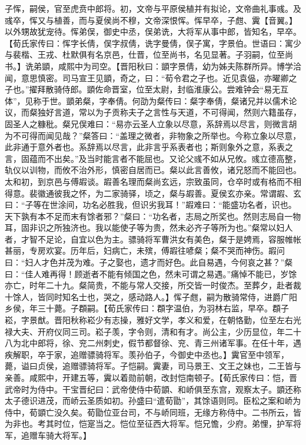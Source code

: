 \documentclass[12pt,UTF8]{ctexbook}
\begin{document}
子恽，嗣侯，官至虎贲中郎将。初，文帝与平原侯植并有拟论，文帝曲礼事彧。及彧卒，恽又与植善，而与夏侯尚不穆，文帝深恨恽。恽早卒，子甝、霬【音翼。】以外甥故犹宠待。恽弟俣，御史中丞，俣弟诜，大将军从事中郎，皆知名，早卒。【荀氏家传曰：恽字长倩，俣字叔倩，诜字曼倩，俣子寓，字景伯。世语曰：寓少与裴楷、王戎、杜默俱有名京邑，仕晋，位至尚书，名见显著。子羽嗣，位至尚书。】诜弟顗，咸熙中为司空。【晋阳秋曰：顗字景倩，幼为姊夫陈群所异。博学洽闻，意思慎密。司马宣王见顗，奇之，曰：“荀令君之子也。近见袁偘，亦曜卿之子也。”擢拜散骑侍郎。顗佐命晋室，位至太尉，封临淮康公。尝难钟会“易无互体”，见称于世。顗弟粲，字奉倩。何劭为粲传曰：粲字奉倩，粲诸兄并以儒术论议，而粲独好言道，常以为子贡称夫子之言性与天道，不可得闻，然则六籍虽存，固圣人之糠秕。粲兄俣难曰：“易亦云圣人立象以尽意，系辞焉以尽言，则微言胡为不可得而闻见哉？”粲答曰：“盖理之微者，非物象之所举也。今称立象以尽意，此非通于意外者也。系辞焉以尽言，此非言乎系表者也；斯则象外之意，系表之言，固蕴而不出矣。”及当时能言者不能屈也。又论父彧不如从兄攸。彧立德高整，轨仪以训物，而攸不治外形，慎密自居而已。粲以此言善攸，诸兄怒而不能回也。太和初，到京邑与傅嘏谈。嘏善名理而粲尚玄远，宗致虽同，仓卒时或有格而不相得意。裴徽通彼我之怀，为二家骑驿，顷之，粲与嘏善。夏侯玄亦亲。常谓嘏、玄曰：“子等在世涂间，功名必胜我，但识劣我耳！”嘏难曰：“能盛功名者，识也。天下孰有本不足而末有馀者邪？”粲曰：“功名者，志局之所奖也。然则志局自一物耳，固非识之所独济也。我以能使子等为贵，然未必齐子等所为也。”粲常以妇人者，才智不足论，自宜以色为主。骠骑将军曹洪女有美色，粲于是娉焉，容服帷帐甚丽，专房欢宴。历年后，妇病亡，未殡，傅嘏往喭粲；粲不哭而神伤。嘏问曰：“妇人才色并茂为难。子之娶也，遗才而好色。此自易遇，今何哀之甚？”粲曰：“佳人难再得！顾逝者不能有倾国之色，然未可谓之易遇。”痛悼不能已，岁馀亦亡，时年二十九。粲简贵，不能与常人交接，所交皆一时俊杰。至葬夕，赴者裁十馀人，皆同时知名士也，哭之，感动路人。】恽子甝，嗣为散骑常侍，进爵广阳乡侯，年三十薨。子頵嗣。【荀氏家传曰：頵字温伯，为羽林右监，早卒。頵子崧，字景猷。晋阳秋称崧少有志操，雅好文学，孝义和爱，在朝恪勤，位至左右光禄大夫、开府仪同三司。崧子羡，字令则，清和有才。尚公主，少历显位，年二十八为北中郎将，徐、兖二州刺史，假节都督徐、兖、青三州诸军事。在任十年，遇疾解职，卒于家，追赠骠骑将军。羡孙伯子，今御史中丞也。】霬官至中领军，薨，谥曰贞侯，追赠骠骑将军。子恺嗣。霬妻，司马景王、文王之妹也，二王皆与亲善。咸熙中，开建五等，霬以着勋前朝，改封恺南顿子。【荀氏家传曰：恺，晋武帝时为侍中。干宝晋纪曰：武帝使侍中荀顗、和峤俱至东宫，观察太子。顗还称太子德识进茂，而峤云圣质如初。孙盛曰“遣荀勖”，其馀语则同。臣松之案和峤为侍中，荀顗亡没久矣。荀勖位亚台司，不与峤同班，无缘方称侍中。二书所云，皆为非也。考其时位，恺寔当之。恺位至征西大将军。恺兄憺，少府。弟悝，护军将军，追赠车骑大将军。】
\end{document}
